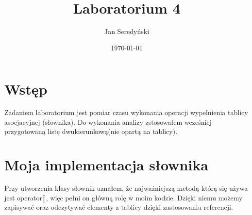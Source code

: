 \documentclass[11pt]{article}
\begin{document}
\title{Laboratorium 4}
\author{Jan Seredyński}
\date{\today}
\maketitle

\section{Wstęp}
Zadaniem laboratorium jest pomiar czasu wykonania operacji wypelnienia tablicy asocjacyjnej (słownika). Do wykonania analizy zstosowałem wcześniej przygotowaną listę dwukierunkową(nie opartą na tablicy).


\section{Moja implementacja słownika}
Przy utworzenia klasy słownik uznałem, że najważniejszą metodą którą się używa jest operator[], więc pełni on główną rolę w moim kodzie. Dzięki niemu możemy zapisywać oraz odczytywać elementy z tablicy dzięki zastosowaniu referencji.
\end{document}
